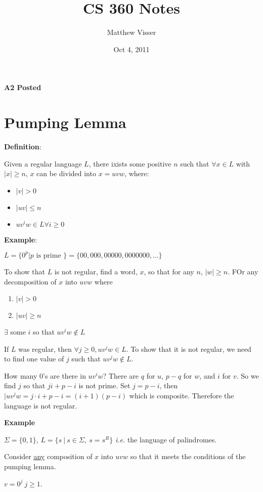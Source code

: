 \documentclass[12pt]{article}
\begin{document}
\title{CS 360 Notes}
\author{Matthew Visser}
\date{Oct  4, 2011}
\maketitle

\textbf{A2 Posted}

\section{Pumping Lemma}

\textbf{Definition}:

Given a regular language $L$, there ixists some positive $n$ such that $\forall
x \in L$ with $|x|\geq n$, $x$ can be divided into $x = uvw$, where:
\begin{itemize}
	\item $|v|>0$
	\item $|uv|\leq n$
	\item $uv^iw\in L \forall i \geq 0$
\end{itemize}

\textbf{Example}:

$L = \{ 0^p | p \text{ is prime } \} = \{00,000,00000,0000000,\dots\}$

To show that $L$ is not regular, find a word, $x$, so that for any $n$, 
$|w|\geq n$. FOr any decomposition of $x$ into $uvw$ where \begin{enumerate}
	\item $|v|>0$
	\item $|uv|\geq n$
\end{enumerate}
$\exists$ some $i$ so that $uv^iw \notin L$

If $L$ was regular, then $\forall j \geq 0, uv^jw \in L$. To show that it is not
regular, we need to find one value of $j$ such that $uv^jw \notin L$.

How many 0's are there in $uv^iw$? There are $q$ for $u$, $p-q$ for $w$, and $i$
for $v$. So we find $j$ so that $ji + p-i$ is not prime. Set $j = p-i$, then
$|uv^jw = j\cdot i + p - i = (i+1)(p-i)$ which is composite. Therefore the
language is not regular.

\textbf{Example}

$\Sigma = \{0,1\}$,
$L = \{ s\ |\ s \in \Sigma,\ s = s^R \}$ \textit{i.e.} the language of
palindromes.

Consider \underline{any} composition of $x$ into $uvw$ so that it meets the
conditions of the pumping lemma.

$v = 0^j\ j \geq 1$.
\end{document}
